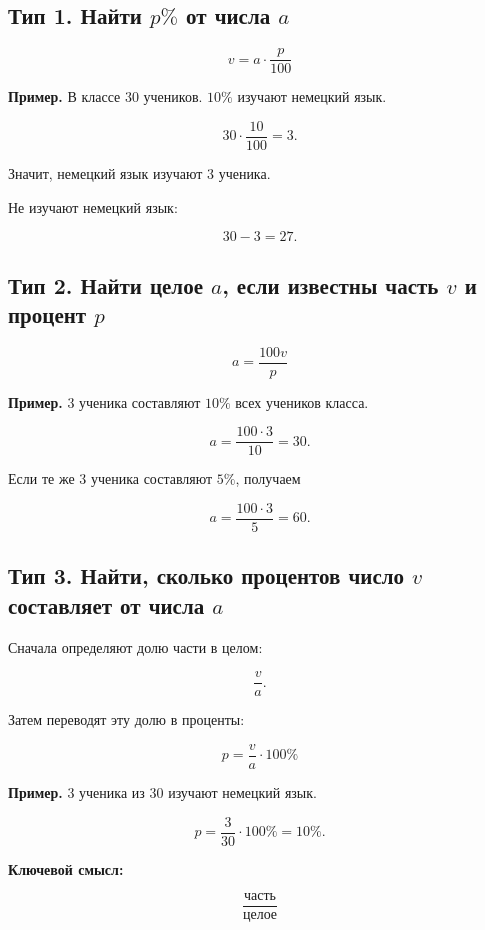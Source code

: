 \documentclass[a4paper,12pt]{article}
\newcommand{\key}[1]{\textbf{\color{darkaccent}#1}}
\begin{document}

\subsection*{Тип 1. Найти $p\%$ от числа $a$}

\[
\boxed{
v=a\cdot\frac{p}{100}
}
\]

\textbf{Пример.}
В классе $30$ учеников.
$10\%$ изучают немецкий язык.

\[
30\cdot\frac{10}{100}=3.
\]

Значит, немецкий язык изучают $3$ ученика.

Не изучают немецкий язык:

\[
30-3=27.
\]


\subsection*{Тип 2. Найти целое $a$, если известны часть $v$ и процент $p$}

\[
\boxed{
a=\frac{100v}{p}
}
\]

\textbf{Пример.}
$3$ ученика составляют $10\%$ всех учеников класса.

\[
a
=
\frac{100\cdot3}{10}
=
30.
\]

Если те же $3$ ученика составляют $5\%$,
получаем

\[
a
=
\frac{100\cdot3}{5}
=
60.
\]


\subsection*{Тип 3. Найти, сколько процентов число $v$ составляет от числа $a$}

Сначала определяют долю части в целом:

\[
\frac{v}{a}.
\]

Затем переводят эту долю в проценты:

\[
\boxed{
p=\frac{v}{a}\cdot100\%
}
\]

\textbf{Пример.}
$3$ ученика из $30$ изучают немецкий язык.

\[
p
=
\frac{3}{30}\cdot100\%
=
10\%.
\]

\key{Ключевой смысл:}

\[
\frac{\text{часть}}{\text{целое}}
\]
\end{document}
